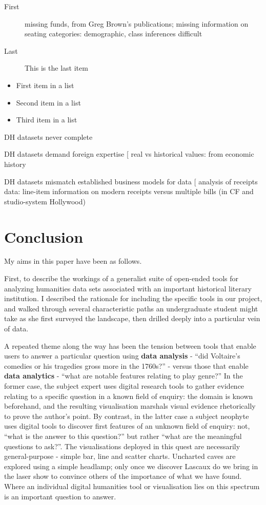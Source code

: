 \documentclass[	DIV=calc,%
							paper=a4,%
							fontsize=11pt,%
							twocolumn]{scrartcl}	 					%
\begin{document}
\begin{description}
	\item[First] missing funds, from Greg Brown’s publications; missing information on seating categories: demographic, class inferences difficult
	\item[Last] This is the last item
\end{description}

\begin{itemize}
	\item First item in a list
	\item Second item in a list
	\item Third item in a list
\end{itemize}

DH datasets never complete

DH datasets demand foreign expertise
  [ real vs historical values: from economic history

DH datasets mismatch established business models for data
  [ analysis of receipts data: line-item information on modern receipts versus multiple bills (in CF and studio-system Hollywood)

\section*{Conclusion}

My aims in this paper have been as follows.

First, to describe the workings of a generalist suite of open-ended tools for analyzing humanities data sets associated with an important historical literary institution.  I described the rationale for including the specific tools in our project, and walked through several characteristic paths an undergraduate student might take as she first surveyed the landscape, then drilled deeply into a particular vein of data.

A repeated theme along the way has been the tension between tools that enable users to answer a particular question using \textbf{data analysis} - ``did Voltaire's comedies or his tragedies gross more in the 1760s?'' - versus those that enable \textbf{data analytics} - ``what are notable features relating to play genre?''  In the former case, the subject expert uses digital research tools to gather evidence relating to a specific question in a known field of enquiry: the domain is known beforehand, and the resulting visualisation marshals visual evidence rhetorically to prove the author's point.  By contrast, in the latter case a subject neophyte uses digital tools to discover first features of an unknown field of enquiry: not, ``what is the answer to this question?'' but rather ``what are the meaningful questions to ask?''.  The visualisations deployed in this quest are necessarily general-purpose - simple bar, line and scatter charts.  Uncharted caves are explored using a simple headlamp; only once we discover Lascaux do we bring in the laser show to convince others of the importance of what we have found.  Where an individual digital humanities tool or visualisation lies on this spectrum is an important question to answer.
\end{document}
